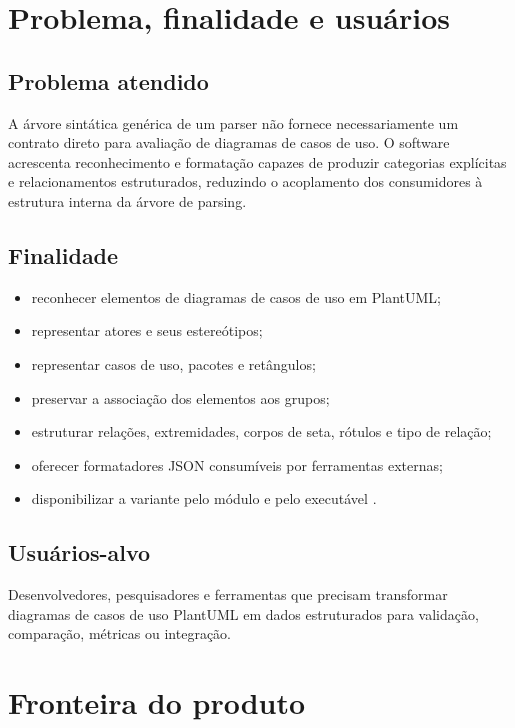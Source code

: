 \documentclass[11pt,a4paper]{article}
\newcommand{\code}[1]{\texttt{\detokenize{#1}}}
\begin{document}
\section{Problema, finalidade e usuários}

\subsection{Problema atendido}

A árvore sintática genérica de um parser não fornece necessariamente um contrato direto para avaliação de diagramas de casos de uso. O software acrescenta reconhecimento e formatação capazes de produzir categorias explícitas e relacionamentos estruturados, reduzindo o acoplamento dos consumidores à estrutura interna da árvore de parsing.

\subsection{Finalidade}

\begin{itemize}
  \item reconhecer elementos de diagramas de casos de uso em PlantUML;
  \item representar atores e seus estereótipos;
  \item representar casos de uso, pacotes e retângulos;
  \item preservar a associação dos elementos aos grupos;
  \item estruturar relações, extremidades, corpos de seta, rótulos e tipo de relação;
  \item oferecer formatadores JSON consumíveis por ferramentas externas;
  \item disponibilizar a variante pelo módulo e pelo executável \code{plantuml-parser-hsl}.
\end{itemize}

\subsection{Usuários-alvo}

Desenvolvedores, pesquisadores e ferramentas que precisam transformar diagramas de casos de uso PlantUML em dados estruturados para validação, comparação, métricas ou integração.

\section{Fronteira do produto}
\end{document}
